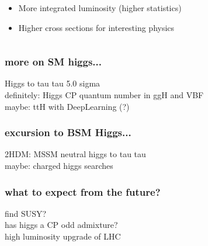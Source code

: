 \documentclass[xcolor={usenames,dvipsnames,svgnames,table}]{beamer}
\begin{document}
\begin{frame}
\begin{columns}
\begin{column}{0.49\textwidth}
\begin{figure}[t]
		\end{figure}
		\begin{itemize}
			\item More integrated luminosity (higher statistics)
			\item Higher cross sections for interesting physics
		\end{itemize}
	\end{column}
	\end{columns}
\end{frame}

\begin{frame}
	\frametitle{more on SM higgs...}
	Higgs to tau tau 5.0 sigma \\
	definitely: Higgs CP quantum number in ggH and VBF \\
	maybe: ttH with DeepLearning (?)
\end{frame}

\begin{frame}
	\frametitle{excursion to BSM Higgs...}
	2HDM: MSSM neutral higgs to tau tau\\
	maybe: charged higgs searches
\end{frame}

\begin{frame}
	\frametitle{what to expect from the future?}
	find SUSY? \\
	has higgs a CP odd admixture?\\
	high luminosity upgrade of LHC
\end{frame}
\end{document}

